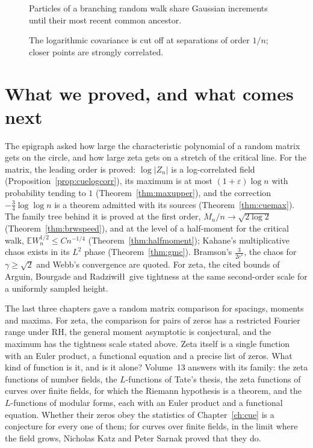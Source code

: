 \begin{figure}[ht]
\centering
{}
\caption{Particles of a branching random walk share Gaussian increments until their most recent common ancestor.}
\label{fig:v12sharedancestry}
\end{figure}

\begin{figure}[ht]
\centering
{}
\caption{The logarithmic covariance is cut off at separations of order $1/n$; closer points are strongly correlated.}
\label{fig:v12logcov}
\end{figure}

\section{What we proved, and what comes next}

The epigraph asked how large the characteristic polynomial of a random matrix gets on the circle, and how large zeta gets on a stretch of the critical line. For the matrix, the leading order is proved: $\log|Z_n|$ is a log-correlated field (Proposition~\ref{prop:cuelogcorr}), its maximum is at most $(1+\varepsilon)\log n$ with probability tending to $1$ (Theorem~\ref{thm:maxupper}), and the correction $-\frac34\log\log n$ is a theorem admitted with its sources (Theorem~\ref{thm:cuemax}). The family tree behind it is proved at the first order, $M_n/n\to\sqrt{2\log2}$ (Theorem~\ref{thm:brwspeed}), and at the level of a half-moment for the critical walk, $\mathbb EW_n^{1/2}\le Cn^{-1/4}$ (Theorem~\ref{thm:halfmoment}); Kahane's multiplicative chaos exists in its $L^2$ phase (Theorem~\ref{thm:gmc}). Bramson's $\frac3{2c^*}$, the chaos for $\gamma\ge\sqrt2$ and Webb's convergence are quoted. For zeta, the cited bounds of Arguin, Bourgade and Radziwi\l\l\ give tightness at the same second-order scale for a uniformly sampled height.

The last three chapters gave a random matrix comparison for spacings, moments and maxima. For zeta, the comparison for pairs of zeros has a restricted Fourier range under RH, the general moment asymptotic is conjectural, and the maximum has the tightness scale stated above. Zeta itself is a single function with an Euler product, a functional equation and a precise list of zeros. What kind of function is it, and is it alone? Volume~13 answers with its family: the zeta functions of number fields, the $L$-functions of Tate's thesis, the zeta functions of curves over finite fields, for which the Riemann hypothesis is a theorem, and the $L$-functions of modular forms, each with an Euler product and a functional equation. Whether their zeros obey the statistics of Chapter~\ref{ch:cue} is a conjecture for every one of them; for curves over finite fields, in the limit where the field grows, Nicholas Katz and Peter Sarnak proved that they do.


